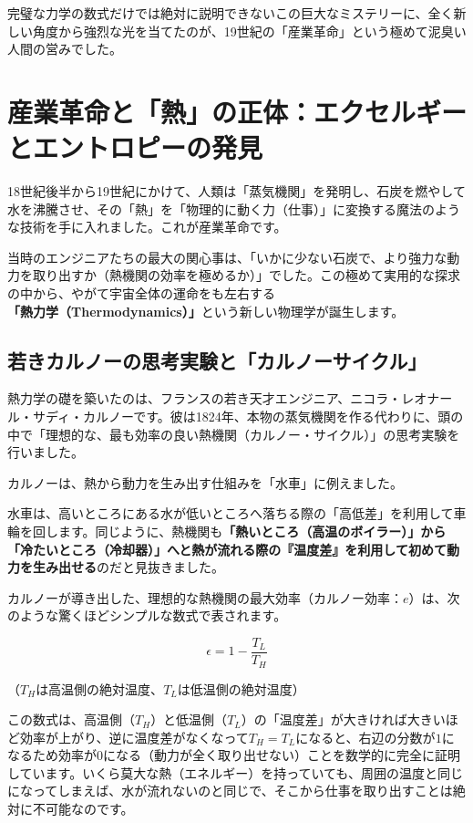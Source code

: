 完璧な力学の数式だけでは絶対に説明できないこの巨大なミステリーに、全く新しい角度から強烈な光を当てたのが、19世紀の「産業革命」という極めて泥臭い人間の営みでした。

\section{産業革命と「熱」の正体：エクセルギーとエントロピーの発見}

18世紀後半から19世紀にかけて、人類は「蒸気機関」を発明し、石炭を燃やして水を沸騰させ、その「熱」を「物理的に動く力（仕事）」に変換する魔法のような技術を手に入れました。これが産業革命です。

当時のエンジニアたちの最大の関心事は、「いかに少ない石炭で、より強力な動力を取り出すか（熱機関の効率を極めるか）」でした。この極めて実用的な探求の中から、やがて宇宙全体の運命をも左右する\textbf{「熱力学（Thermodynamics）」}という新しい物理学が誕生します。

\subsection{若きカルノーの思考実験と「カルノーサイクル」}

熱力学の礎を築いたのは、フランスの若き天才エンジニア、ニコラ・レオナール・サディ・カルノーです。彼は1824年、本物の蒸気機関を作る代わりに、頭の中で「理想的な、最も効率の良い熱機関（カルノー・サイクル）」の思考実験を行いました。

カルノーは、熱から動力を生み出す仕組みを「水車」に例えました。

水車は、高いところにある水が低いところへ落ちる際の「高低差」を利用して車輪を回します。同じように、熱機関も\textbf{「熱いところ（高温のボイラー）」から「冷たいところ（冷却器）」へと熱が流れる際の『温度差』を利用して初めて動力を生み出せる}のだと見抜きました。

カルノーが導き出した、理想的な熱機関の最大効率（カルノー効率：\(e\)）は、次のような驚くほどシンプルな数式で表されます。

\[
\epsilon=1-\frac{T_L}{T_H}
\]

（\(T_H\)は高温側の絶対温度、\(T_L\)は低温側の絶対温度）

この数式は、高温側（\(T_H\)）と低温側（\(T_L\)）の「温度差」が大きければ大きいほど効率が上がり、逆に温度差がなくなって\(T_H=T_L\)になると、右辺の分数が\(1\)になるため効率が\(0\)になる（動力が全く取り出せない）ことを数学的に完全に証明しています。いくら莫大な熱（エネルギー）を持っていても、周囲の温度と同じになってしまえば、水が流れないのと同じで、そこから仕事を取り出すことは絶対に不可能なのです。

